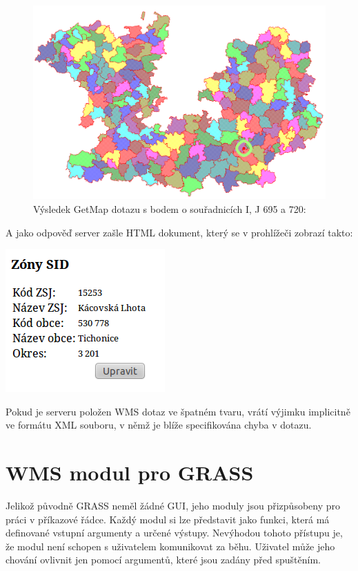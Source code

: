 \documentclass[a4paper,12pt]{article}
\begin{document}
  
\begin{figure}[h!]
 \includegraphics[scale=0.3]{figures/getfeatureinfo}
  \caption{Výsledek GetMap dotazu s bodem o souřadnicích I, J  695 a 720:}
\end{figure}

A jako odpověď server zašle HTML dokument, který se v prohlížeči zobrazí takto:

 \includegraphics[scale=0.7]{figures/getfeatureinforeply}


Pokud je serveru položen WMS dotaz ve špatném tvaru, vrátí výjimku implicitně ve formátu XML souboru, v němž je blíže specifikována chyba v dotazu. 


\newpage

\section{WMS modul pro GRASS}

Jelikož původně GRASS neměl žádné GUI, jeho moduly jsou přizpůsobeny pro práci v příkazové řádce. Každý modul si lze představit jako funkci, která má definované vstupní argumenty a určené výstupy. Nevýhodou tohoto 
přístupu je, že modul není schopen s uživatelem komunikovat za běhu. Uživatel může jeho chování ovlivnit jen pomocí argumentů, které jsou zadány před spuštěním.
\end{document}
